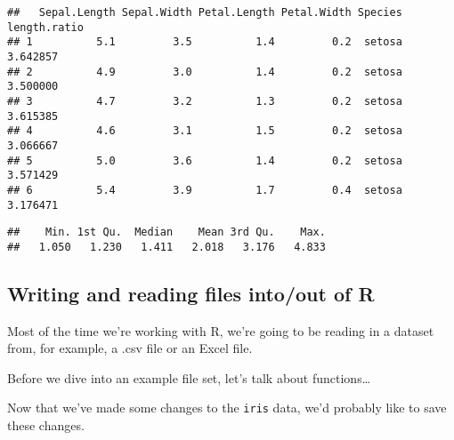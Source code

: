 \documentclass[]{article}
\newenvironment{Shaded}{\begin{snugshade}}{\end{snugshade}}
\newcommand{\KeywordTok}[1]{\textcolor[rgb]{0.13,0.29,0.53}{\textbf{#1}}}
\newcommand{\DecValTok}[1]{\textcolor[rgb]{0.00,0.00,0.81}{#1}}
\newcommand{\StringTok}[1]{\textcolor[rgb]{0.31,0.60,0.02}{#1}}
\newcommand{\OperatorTok}[1]{\textcolor[rgb]{0.81,0.36,0.00}{\textbf{#1}}}
\newcommand{\NormalTok}[1]{#1}
\begin{document}
\begin{Shaded}
\end{Shaded}

\begin{verbatim}
##   Sepal.Length Sepal.Width Petal.Length Petal.Width Species length.ratio
## 1          5.1         3.5          1.4         0.2  setosa     3.642857
## 2          4.9         3.0          1.4         0.2  setosa     3.500000
## 3          4.7         3.2          1.3         0.2  setosa     3.615385
## 4          4.6         3.1          1.5         0.2  setosa     3.066667
## 5          5.0         3.6          1.4         0.2  setosa     3.571429
## 6          5.4         3.9          1.7         0.4  setosa     3.176471
\end{verbatim}

\begin{Shaded}
\end{Shaded}

\begin{verbatim}
##    Min. 1st Qu.  Median    Mean 3rd Qu.    Max. 
##   1.050   1.230   1.411   2.018   3.176   4.833
\end{verbatim}

\subsection{Writing and reading files into/out of
R}\label{writing-and-reading-files-intoout-of-r}

Most of the time we're working with R, we're going to be reading in a
dataset from, for example, a .csv file or an Excel file.

Before we dive into an example file set, let's talk about
functions\ldots{}

Now that we've made some changes to the \texttt{iris} data, we'd
probably like to save these changes.
\end{document}
